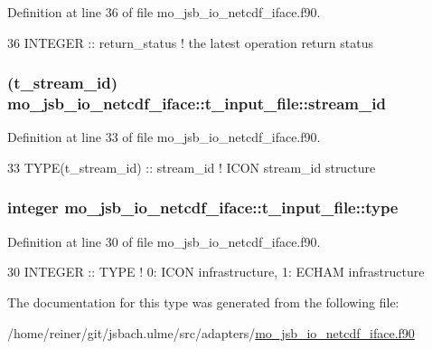 Definition at line 36 of file mo\+\_\+jsb\+\_\+io\+\_\+netcdf\+\_\+iface.\+f90.


\begin{DoxyCode}
36     \textcolor{keywordtype}{INTEGER} :: return\_status    \textcolor{comment}{! the latest operation return status}
\end{DoxyCode}
\hypertarget{structmo__jsb__io__netcdf__iface_1_1t__input__file_abd0f1ebc048fe3d7d552204455f1a50b}{}
\subsubsection[{stream\+\_\+id}]{(t\+\_\+stream\+\_\+id) mo\+\_\+jsb\+\_\+io\+\_\+netcdf\+\_\+iface\+::t\+\_\+input\+\_\+file\+::stream\+\_\+id}\label{structmo__jsb__io__netcdf__iface_1_1t__input__file_abd0f1ebc048fe3d7d552204455f1a50b}


Definition at line 33 of file mo\+\_\+jsb\+\_\+io\+\_\+netcdf\+\_\+iface.\+f90.


\begin{DoxyCode}
33     \textcolor{keywordtype}{TYPE}(t\_stream\_id) :: stream\_id  \textcolor{comment}{! ICON stream\_id structure}
\end{DoxyCode}
\hypertarget{structmo__jsb__io__netcdf__iface_1_1t__input__file_a706953dbeb62c1d74ac1e1fe55394d99}{}
\subsubsection[{type}]{\setlength{\rightskip}{0pt plus 5cm}integer mo\+\_\+jsb\+\_\+io\+\_\+netcdf\+\_\+iface\+::t\+\_\+input\+\_\+file\+::type}\label{structmo__jsb__io__netcdf__iface_1_1t__input__file_a706953dbeb62c1d74ac1e1fe55394d99}


Definition at line 30 of file mo\+\_\+jsb\+\_\+io\+\_\+netcdf\+\_\+iface.\+f90.


\begin{DoxyCode}
30     \textcolor{keywordtype}{INTEGER}           :: \textcolor{keywordtype}{TYPE}                \textcolor{comment}{! 0: ICON infrastructure, 1: ECHAM infrastructure}
\end{DoxyCode}


The documentation for this type was generated from the following file\+:\begin{DoxyCompactItemize}
\item 
/home/reiner/git/jsbach.\+ulme/src/adapters/\hyperlink{mo__jsb__io__netcdf__iface_8f90}{mo\+\_\+jsb\+\_\+io\+\_\+netcdf\+\_\+iface.\+f90}\end{DoxyCompactItemize}

